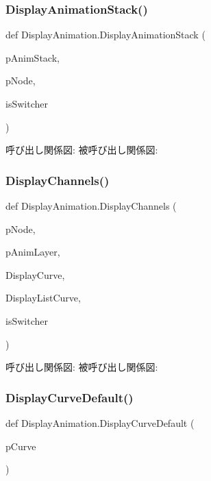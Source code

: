 \subsubsection{\texorpdfstring{Display\+Animation\+Stack()}{DisplayAnimationStack()}}
{\footnotesize\ttfamily def Display\+Animation.\+Display\+Animation\+Stack (\begin{DoxyParamCaption}\item[{}]{p\+Anim\+Stack,  }\item[{}]{p\+Node,  }\item[{}]{is\+Switcher }\end{DoxyParamCaption})}

呼び出し関係図\+:
被呼び出し関係図\+:
\mbox{\label{namespace_display_animation_ac711b47e4bacac4e6ea3a13952d04789}} 
\subsubsection{\texorpdfstring{Display\+Channels()}{DisplayChannels()}}
{\footnotesize\ttfamily def Display\+Animation.\+Display\+Channels (\begin{DoxyParamCaption}\item[{}]{p\+Node,  }\item[{}]{p\+Anim\+Layer,  }\item[{}]{Display\+Curve,  }\item[{}]{Display\+List\+Curve,  }\item[{}]{is\+Switcher }\end{DoxyParamCaption})}

呼び出し関係図\+:
被呼び出し関係図\+:
\mbox{\label{namespace_display_animation_a55353f312afe0c5ef7af7eec3a3ff4f9}} 
\subsubsection{\texorpdfstring{Display\+Curve\+Default()}{DisplayCurveDefault()}}
{\footnotesize\ttfamily def Display\+Animation.\+Display\+Curve\+Default (\begin{DoxyParamCaption}\item[{}]{p\+Curve }\end{DoxyParamCaption})}

